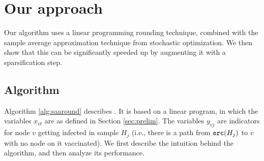
\section{Our approach}
\label{sec:method}

Our algorithm \algo{} uses a linear programming rounding technique, combined with the sample average approximation
technique from stochastic optimization. We then show that this can be significantly speeded up by augmenting it with a sparsification step.

\subsection{Algorithm \algo{}}


Algorithm \ref{alg:saaround} describes \algo{}. It is based on a linear program, in which the variables $x_{vt}$
are as defined in Section \ref{sec:prelim}. The variables $y_{vj}$ are indicators for node $v$ getting infected
in sample $H_j$ (i.e., there is a path from $\texttt{src}(H_j)$ to $v$ with no node on it vaccinated).
We first describe the intuition behind the algorithm, and then analyze its performance.


